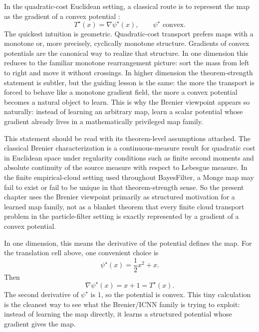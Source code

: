 In the quadratic-cost Euclidean setting, a classical route is to represent the
map as the gradient of a convex potential \citep{villani2003topics,peyre2019computational,vesseron2024brenier}:
\begin{equation}
\label{eq:bf-neural-ot-direct-brenier}
  T^\star(x)=\nabla\psi^\star(x),
  \qquad
  \psi^\star\text{ convex}.
\end{equation}
The quickest intuition is geometric.  Quadratic-cost transport prefers maps with a
monotone or, more precisely, cyclically monotone structure.  Gradients of convex
potentials are the canonical way to realize that structure.  In one dimension this
reduces to the familiar monotone rearrangement picture: sort the mass from left to
right and move it without crossings.  In higher dimension the theorem-strength
statement is subtler, but the guiding lesson is the same: the more the transport is
forced to behave like a monotone gradient field, the more a convex potential
becomes a natural object to learn.  This is why the Brenier viewpoint appears so
naturally: instead of learning an arbitrary map, learn a scalar potential whose
gradient already lives in a mathematically privileged map family.

This statement should be read with its theorem-level assumptions attached.  The
classical Brenier characterization is a continuous-measure result for quadratic
cost in Euclidean space under regularity conditions such as finite second
moments and absolute continuity of the source measure with respect to Lebesgue
measure.  In the finite empirical-cloud setting used throughout BayesFilter, a
Monge map may fail to exist or fail to be unique in that theorem-strength sense.
So the present chapter uses the Brenier viewpoint primarily as structured
motivation for a learned map family, not as a blanket theorem that every finite
cloud transport problem in the particle-filter setting is exactly represented by
a gradient of a convex potential.

In one dimension, this means the derivative of the potential defines the map.
For the translation cell above, one convenient choice is
\begin{equation}
\label{eq:bf-neural-ot-direct-brenier-example}
  \psi^\star(x)=\frac{1}{2}x^2+x.
\end{equation}
Then
\begin{equation}
\label{eq:bf-neural-ot-direct-brenier-example-grad}
  \nabla\psi^\star(x)=x+1=T^\star(x).
\end{equation}
The second derivative of \(\psi^\star\) is \(1\), so the potential is convex.
This tiny calculation is the cleanest way to see what the Brenier/ICNN family is
trying to exploit: instead of learning the map directly, it learns a structured
potential whose gradient gives the map.

